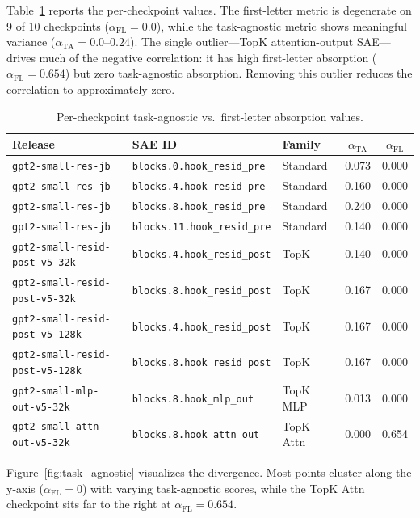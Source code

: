 \documentclass{article}
\begin{document}
Table~\ref{tab:e3} reports the per-checkpoint values. The first-letter metric is degenerate on 9 of 10 checkpoints ($\alpha_{\text{FL}} = 0.0$), while the task-agnostic metric shows meaningful variance ($\alpha_{\text{TA}} = 0.0$--$0.24$). The single outlier---TopK attention-output SAE---drives much of the negative correlation: it has high first-letter absorption ($\alpha_{\text{FL}} = 0.654$) but zero task-agnostic absorption. Removing this outlier reduces the correlation to approximately zero.

\begin{table}[t]
\centering
\caption{Per-checkpoint task-agnostic vs.~first-letter absorption values.}
\label{tab:e3}
\begin{tabular}{lllcc}
\toprule
Release & SAE ID & Family & $\alpha_{\text{TA}}$ & $\alpha_{\text{FL}}$ \\
\midrule
\texttt{gpt2-small-res-jb} & \texttt{blocks.0.hook\_resid\_pre} & Standard & 0.073 & 0.000 \\
\texttt{gpt2-small-res-jb} & \texttt{blocks.4.hook\_resid\_pre} & Standard & 0.160 & 0.000 \\
\texttt{gpt2-small-res-jb} & \texttt{blocks.8.hook\_resid\_pre} & Standard & 0.240 & 0.000 \\
\texttt{gpt2-small-res-jb} & \texttt{blocks.11.hook\_resid\_pre} & Standard & 0.140 & 0.000 \\
\texttt{gpt2-small-resid-post-v5-32k} & \texttt{blocks.4.hook\_resid\_post} & TopK & 0.140 & 0.000 \\
\texttt{gpt2-small-resid-post-v5-32k} & \texttt{blocks.8.hook\_resid\_post} & TopK & 0.167 & 0.000 \\
\texttt{gpt2-small-resid-post-v5-128k} & \texttt{blocks.4.hook\_resid\_post} & TopK & 0.167 & 0.000 \\
\texttt{gpt2-small-resid-post-v5-128k} & \texttt{blocks.8.hook\_resid\_post} & TopK & 0.167 & 0.000 \\
\texttt{gpt2-small-mlp-out-v5-32k} & \texttt{blocks.8.hook\_mlp\_out} & TopK MLP & 0.013 & 0.000 \\
\texttt{gpt2-small-attn-out-v5-32k} & \texttt{blocks.8.hook\_attn\_out} & TopK Attn & 0.000 & 0.654 \\
\bottomrule
\end{tabular}
\end{table}

Figure~\ref{fig:task_agnostic} visualizes the divergence. Most points cluster along the y-axis ($\alpha_{\text{FL}} = 0$) with varying task-agnostic scores, while the TopK Attn checkpoint sits far to the right at $\alpha_{\text{FL}} = 0.654$.
\end{document}
